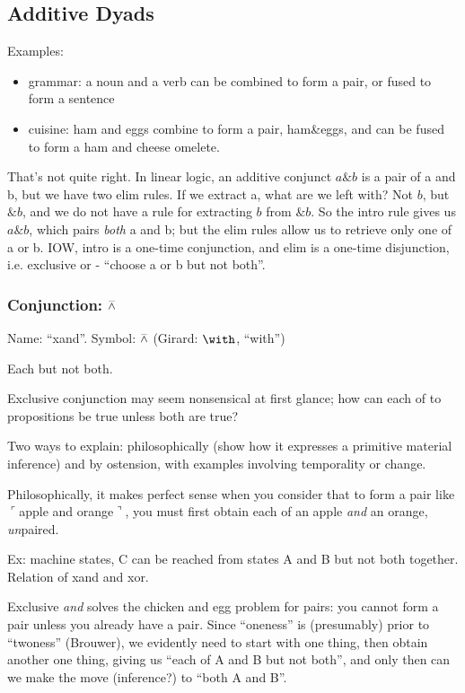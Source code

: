 \documentclass{article}
\begin{document}
\subsection{Additive Dyads}

Examples:

\begin{itemize}
\item grammar: a noun and a verb can be combined to form a pair, or fused to form a sentence
  \item cuisine: ham and eggs combine to form a pair, ham\&eggs, and
    can be fused to form a ham and cheese omelete.
\end{itemize}

That's not quite right. In linear logic, an additive conjunct \(a\&b\)
is a pair of a and b, but we have two elim rules. If we extract a,
what are we left with? Not \(b\), but \(\&b\), and we do not have a
rule for extracting \(b\) from \(\&b\). So the intro rule gives us
\(a\&b\), which pairs \textit{both} a and b; but the elim rules allow
us to retrieve only one of a or b. IOW, intro is a one-time
conjunction, and elim is a one-time disjunction, i.e. exclusive or -
``choose a or b but not both''.



\subsubsection[Conjunction: each but not both]{Conjunction: \(\barwedge\)}

Name: ``xand''.  Symbol: \(\barwedge\) (Girard: \(\with\), ``with'')

Each but not both.

Exclusive conjunction may seem nonsensical at first glance; how can
each of to propositions be true unless both are true?

Two ways to explain: philosophically (show how it expresses a primitive
material inference) and by ostension, with examples involving
temporality or change.

Philosophically, it makes perfect sense when you consider that to form
a pair like \(\ulcorner\)apple and orange\(\urcorner\), you must first
obtain each of an apple \textit{and} an orange, \textit{un}paired.

Ex: machine states, C can be reached from states A and B but not both
together.  Relation of xand and xor.

Exclusive \textit{and} solves the chicken and egg problem for pairs:
you cannot form a pair unless you already have a pair. Since
``oneness'' is (presumably) prior to ``twoness'' (Brouwer), we
evidently need to start with one thing, then obtain another one thing,
giving us ``each of A and B but not both'', and only then can we make
the move (inference?) to ``both A and B''.
\end{document}
